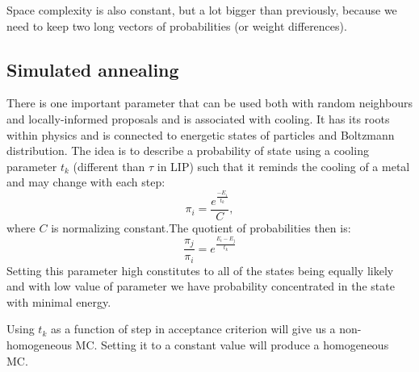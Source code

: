 		Space complexity is  also constant, but a lot bigger than previously, because we need to keep two  long vectors of probabilities (or weight differences).
	
\subsection{Simulated annealing}
	There is one important parameter that can be used both with random neighbours and locally-informed proposals and is associated with cooling. It has its roots within physics and is connected to energetic states of particles and Boltzmann distribution. The idea is to describe a probability of state using a cooling parameter $t_k$ (different than $\tau$ in LIP) such that it reminds the cooling of a metal and may change with each step:
	\begin{equation*}
		\pi_i = \frac{e^{\frac{-E_i}{t_k}}}{C},
	\end{equation*}
	where $C$ is normalizing constant.The quotient of probabilities then is:
	\begin{equation*}
		\frac{\pi_j}{\pi_i} = e^{\frac{E_i - E_j}{t_k}}
	\end{equation*}
	Setting this parameter high constitutes to all of the states being equally likely and with low value of parameter we have probability concentrated in the state with minimal energy.
	
	Using $t_k$ as a function of step in acceptance criterion will give us a non-homogeneous MC. Setting it to a constant value will produce a homogeneous MC.